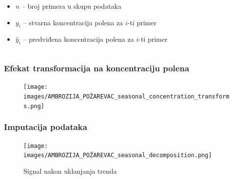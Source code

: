 \begin{frame}
\begin{columns}[T, totalwidth=\textwidth]
\begin{column}{0.48\textwidth}
            \begin{itemize}
                \item $n$ -- broj primera u skupu podataka
                \item $y_i$ -- stvarna koncentracija polena za $i$-ti primer
                \item $\hat{y}_i$ -- predviđena koncentracija polena za $i$-ti primer
            \end{itemize}
        \end{column}

    \end{columns}

\end{frame}



\begin{frame}
    \frametitle{Efekat transformacija na koncentraciju polena}

    \begin{figure}
        \centering
        \texttt{[image: images/AMBROZIJA\_POŽAREVAC\_seasonal\_concentration\_transforms.png]}

    \end{figure}
\end{frame}



\begin{frame}
    \frametitle{Imputacija podataka}

    \begin{figure}
        \centering
        \texttt{[image: images/AMBROZIJA\_POŽAREVAC\_seasonal\_decomposition.png]}
        \caption{Signal nakon uklanjanja trenda}
    \end{figure}

\end{frame}




